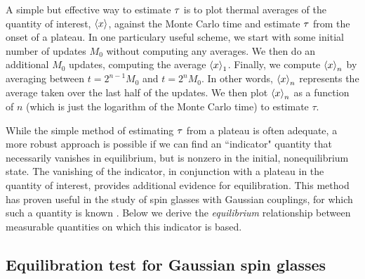 A simple but effective way to estimate $\tau$ is to plot thermal averages
of the quantity of interest, $\left< x \right>$, against the Monte Carlo time and
estimate $\tau$ from the onset of a plateau. In one particulary useful
scheme,
we start with some initial number of updates $M_0$ without computing any
averages. We then do an additional $M_0$ updates, computing the average
$\left< x \right>_1$. Finally, we compute $\left< x \right>_n$ by averaging between $t = 2^{n-1}
M_0$ and $t = 2^n M_0$. In other words, $\left< x \right>_n$ represents the average taken
over the last half of the updates. We then plot $\left< x \right>_n$ as a function of $n$
(which is just the logarithm of the Monte Carlo time) to estimate $\tau$.



While the simple method of estimating $\tau$ from a plateau is often
adequate, a more robust approach is possible if we can find an ``indicator"
quantity that necessarily vanishes in equilibrium, but is nonzero in the
initial, nonequilibrium state.
The vanishing of the indicator, in conjunction with a plateau in the quantity
of interest, provides additional evidence for equilibration. This method has
proven useful in the study of spin glasses with Gaussian couplings, for which
such a quantity is known \autocite{katzgraber2003monte}. Below we derive the
\emph{equilibrium} relationship between measurable quantities on which this
indicator is based.


\subsection{Equilibration test for Gaussian spin glasses}
\label{sec:equilibration-test-gaussian}

